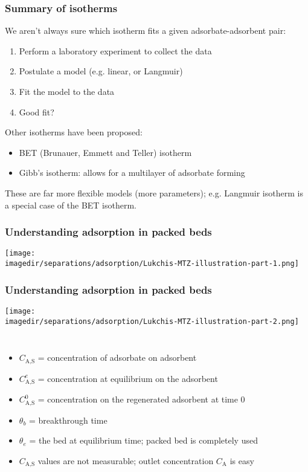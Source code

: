 \begin{frame}\frametitle{Summary of isotherms}
	We aren't always sure which isotherm fits a given adsorbate-adsorbent pair:
	\begin{enumerate}
		\item	Perform a laboratory experiment to collect the data
		\item	Postulate a model (e.g. linear, or Langmuir)
		\item	Fit the model to the data
		\item	Good fit? 
	\end{enumerate}
	
	\vspace{24pt}
	Other isotherms have been proposed:
	\begin{itemize}
		\item	BET (Brunauer, Emmett and Teller) isotherm
		\item	Gibb's isotherm: allows for a multilayer of adsorbate forming
	\end{itemize}
	
	These are far more flexible models (more parameters); e.g. Langmuir isotherm is a special case of the BET isotherm.
\end{frame}

\begin{frame}\frametitle{Understanding adsorption in packed beds}
	\begin{center}
		\texttt{[image: \\imagedir/separations/adsorption/Lukchis-MTZ-illustration-part-1.png]}
	\end{center}
\end{frame}

\begin{frame}\frametitle{Understanding adsorption in packed beds}
	\begin{center}
		\texttt{[image: \\imagedir/separations/adsorption/Lukchis-MTZ-illustration-part-2.png]}
	\end{center}
	\vspace{-16pt}
	\vspace{-18pt}
	\begin{columns}[t]
			\begin{itemize}
				\item	{\small $C_\text{A,S}$ = concentration of adsorbate on adsorbent}
				\item	{\small $C_\text{A,S}^e$ = concentration at equilibrium on the adsorbent}
				\item	{\small $C_\text{A,S}^0$ = concentration on the regenerated adsorbent at time 0}
				\item	{\small $\theta_b$ = breakthrough time}
				\item	{\small $\theta_e$ = the bed at equilibrium time; packed bed is completely used}
				\item	{\small $C_\text{A,S}$ values are not measurable; outlet concentration $C_\text{A}$ is easy}
			\end{itemize}
	\end{columns}	
\end{frame}

